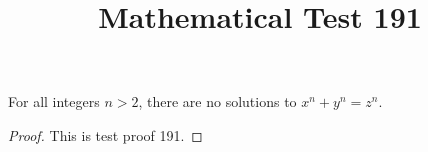\documentclass{amsart}
\begin{document}
\title{Mathematical Test 191}
\begin{theorem}
For all integers $n > 2$, there are no solutions to $x^n + y^n = z^n$.
\end{theorem}
\begin{proof}
This is test proof 191.
\end{proof}
\end{document}
